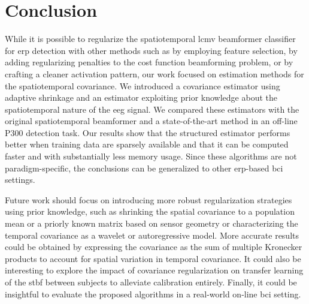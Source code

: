 	\section{Conclusion}
	While it is possible to regularize the spatiotemporal \ac{lcmv} beamformer
	classifier for \ac{erp} detection with other methods such as by employing feature selection,
	by adding regularizing penalties to the cost
	function beamforming problem, or by crafting a cleaner activation pattern, our work focused on
	estimation methods for the spatiotemporal covariance.
	We introduced a covariance estimator using adaptive shrinkage and an
	estimator exploiting prior knowledge about the spatiotemporal nature of the \ac{eeg}
	signal.
	We compared these estimators with the original spatiotemporal
	beamformer and a state-of-the-art method in an off-line P300 detection task.
	Our results show that the structured estimator performs better when training data are sparsely available and that it can be computed faster and with substantially less memory usage.
	Since these algorithms are not paradigm-specific,  the conclusions can be generalized to
	other \ac{erp}-based \ac{bci} settings.

	Future work should focus on introducing more robust regularization strategies using prior knowledge, such as shrinking the spatial covariance to a population mean or a priorly known matrix based on sensor geometry or characterizing the temporal covariance as a wavelet or autoregressive model.
	More accurate results could be obtained by expressing the covariance as the sum of multiple Kronecker products to account for spatial variation in temporal
	covariance.
	It could also be interesting to explore the impact of covariance regularization on transfer learning of the \ac{stbf} between subjects to alleviate calibration entirely.
	Finally, it could be insightful to evaluate the proposed algorithms in a
	real-world on-line \ac{bci} setting.


